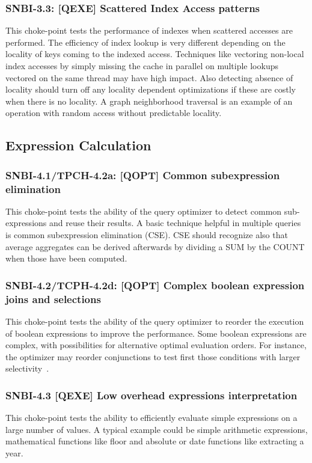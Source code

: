 \subsubsection{SNBI-3.3: [QEXE] Scattered Index Access patterns}
\label{choke_point_3.3}
This choke-point tests the performance of indexes when scattered accesses are performed. The efficiency of index lookup is very different depending on the locality of keys coming to the indexed access.
Techniques like vectoring non-local index accesses by simply missing the cache in parallel on multiple lookups vectored on the same thread may have high impact.
Also detecting absence of locality should turn off any locality dependent optimizations if these are costly when there is no locality. A graph neighborhood traversal is an example of an operation with random access without predictable locality.


\subsection{Expression Calculation}

\subsubsection{SNBI-4.1/TPCH-4.2a: [QOPT]  Common subexpression elimination}
\label{choke_point_4.1}
This choke-point tests the ability of the query optimizer to detect common sub-expressions and reuse their results. A basic technique helpful in multiple queries is common subexpression elimination (CSE).
CSE should recognize also that average aggregates can be derived afterwards by dividing a SUM by the COUNT when those have been computed.

\subsubsection{SNBI-4.2/TCPH-4.2d: [QOPT]  Complex boolean expression joins and selections}
\label{choke_point_4.2}
This choke-point tests the ability of the query optimizer to reorder the execution of boolean expressions to improve the performance. Some boolean expressions are complex, with possibilities for alternative optimal evaluation orders.
For instance, the optimizer may reorder conjunctions to test first those conditions with larger selectivity~\cite{DBLP:conf/vldb/Moerkotte98}.

\subsubsection{SNBI-4.3 [QEXE] Low overhead expressions interpretation}
\label{choke_point_4.3}
This choke-point tests the ability to efficiently evaluate simple expressions on a large number of values. A typical example could be simple arithmetic expressions, mathematical functions like floor and absolute or date functions like extracting a year.


